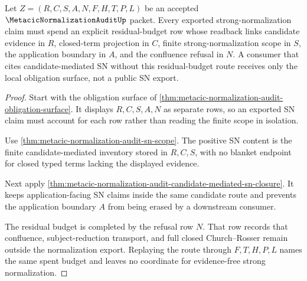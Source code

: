 \begin{theorem}
\label{thm:metacic-normalization-audit-residual-budget-obligation}
Let $Z=(R,C,S,A,N,F,H,T,P,L)$ be an accepted $\MetacicNormalizationAuditUp$ packet. Every exported strong-normalization claim must spend an explicit residual-budget row whose readback links candidate evidence in $R$, closed-term projection in $C$, finite strong-normalization scope in $S$, the application boundary in $A$, and the confluence refusal in $N$. A consumer that cites candidate-mediated SN without this residual-budget route receives only the local obligation surface, not a public SN export.
\end{theorem}
\begin{proof}
Start with the obligation surface of \autoref{thm:metacic-normalization-audit-obligation-surface}. It displays $R,C,S,A,N$ as separate rows, so an exported SN claim must account for each row rather than reading the finite scope in isolation.

Use \autoref{thm:metacic-normalization-audit-sn-scope}. The positive SN content is the finite candidate-mediated inventory stored in $R,C,S$, with no blanket endpoint for closed typed terms lacking the displayed evidence.

Next apply \autoref{thm:metacic-normalization-audit-candidate-mediated-sn-closure}. It keeps application-facing SN claims inside the same candidate route and prevents the application boundary $A$ from being erased by a downstream consumer.

The residual budget is completed by the refusal row $N$. That row records that confluence, subject-reduction transport, and full closed Church--Rosser remain outside the normalization export. Replaying the route through $F,T,H,P,L$ names the same spent budget and leaves no coordinate for evidence-free strong normalization.
\end{proof}


